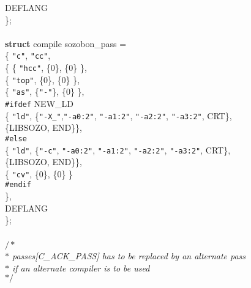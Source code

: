 \begin{flushleft}
\hspace*{3\indentation}DEFLANG\mbox{}\\
\};\mbox{}\\
\mbox{}\\
{\bf struct} compile sozobon\_pass =\mbox{}\\
\{  {\tt"c"}, {\tt"cc"},\mbox{}\\
\hspace*{3\indentation}\{  \{ {\tt"hcc"}, \{0\}, \{0\} \},\mbox{}\\
\hspace*{6\indentation}\{ {\tt"top"}, \{0\}, \{0\} \},\mbox{}\\
\hspace*{6\indentation}\{ {\tt"as"}, \{{\tt"-"}\}, \{0\} \},\mbox{}\\
{\tt \#ifdef} NEW\_LD\mbox{}\\
\hspace*{6\indentation}\{ {\tt"ld"}, \{{\tt"-X\_"},{\tt"-a0:2"}, {\tt"-a1:2"}, {\tt"-a2:2"}, {\tt"-a3:2"}, CRT\},\mbox{}\\
\hspace*{9\indentation}\{LIBSOZO, END\}\},\mbox{}\\
{\tt \#else}\mbox{}\\
\hspace*{6\indentation}\{ {\tt"ld"}, \{{\tt"-c"}, {\tt"-a0:2"}, {\tt"-a1:2"}, {\tt"-a2:2"}, {\tt"-a3:2"}, CRT\}, \mbox{}\\
\hspace*{11\indentation}\{LIBSOZO, END\}\},\mbox{}\\
\hspace*{6\indentation}\{ {\tt"cv"}, \{0\}, \{0\} \}\mbox{}\\
{\tt \#endif}\mbox{}\\
\hspace*{3\indentation}\},\mbox{}\\
\hspace*{3\indentation}DEFLANG\mbox{}\\
\};\mbox{}\\
\mbox{}\\
{$/\ast$\it{}\mbox{}\\
\hspace*{1\indentation}$\ast$ passes[C\_ACK\_PASS] has to be replaced by an alternate pass\mbox{}\\
\hspace*{1\indentation}$\ast$ if an alternate compiler is to be used\mbox{}\\
\hspace*{1\indentation}$\ast/$}\mbox{}\\

\end{flushleft}
